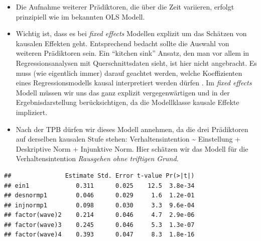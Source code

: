 \documentclass[
]{book}
\newenvironment{Shaded}{\begin{snugshade}}{\end{snugshade}}
\newcommand{\DataTypeTok}[1]{\textcolor[rgb]{0.13,0.29,0.53}{#1}}
\newcommand{\KeywordTok}[1]{\textcolor[rgb]{0.13,0.29,0.53}{\textbf{#1}}}
\newcommand{\NormalTok}[1]{#1}
\newcommand{\OperatorTok}[1]{\textcolor[rgb]{0.81,0.36,0.00}{\textbf{#1}}}
\newcommand{\StringTok}[1]{\textcolor[rgb]{0.31,0.60,0.02}{#1}}
\begin{document}
\begin{itemize}
\item
  Die Aufnahme weiterer Prädiktoren, die über die Zeit variieren, erfolgt prinzipiell wie im bekannten OLS Modell.
\item
  Wichtig ist, dass es bei \emph{fixed effects} Modellen explizit um das Schätzen von kausalen Effekten geht. Entsprechend bedacht sollte die Auswahl von weiteren Prädiktoren sein. Ein ``kitchen sink'' Ansatz, den man vor allem in Regressionsanalysen mit Querschnittsdaten sieht, ist hier nicht angebracht. Es muss (wie eigentlich immer) darauf geachtet werden, welche Koeffizienten eines Regressionsmodells kausal interpretiert werden dürfen \citep{keeleCausalInterpretationEstimated2019}. Im \emph{fixed effects} Modell müssen wir uns das ganz explizit vergegenwärtigen und in der Ergebnisdarstellung berücksichtigen, da die Modellklasse kausale Effekte impliziert.
\item
  Nach der TPB dürfen wir dieses Modell annehmen, da die drei Prädiktoren auf derselben kausalen Stufe stehen: Verhaltensintention \textasciitilde{} Einstellung + Deskriptive Norm + Injunktive Norm. Hier schätzen wir das Modell für die Verhaltensintention \emph{Rausgehen ohne triftigen Grund}.
\end{itemize}

\begin{Shaded}
\end{Shaded}

\begin{verbatim}
##               Estimate Std. Error t-value Pr(>|t|)
## ein1             0.311      0.025    12.5  3.8e-34
## desnormp1        0.046      0.029     1.6  1.2e-01
## injnormp1        0.098      0.030     3.3  9.6e-04
## factor(wave)2    0.214      0.046     4.7  2.9e-06
## factor(wave)3    0.245      0.046     5.3  1.3e-07
## factor(wave)4    0.393      0.047     8.3  1.8e-16
\end{verbatim}
\end{document}
